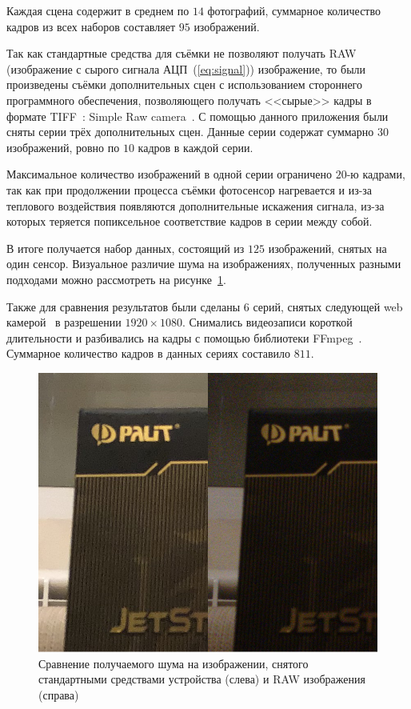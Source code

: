 Каждая сцена содержит в среднем по $14$ фотографий, суммарное количество кадров из всех наборов составляет $95$ изображений.


Так как стандартные средства для съёмки не позволяют получать RAW (изображение с сырого сигнала АЦП~(\ref{eq:signal})) изображение, то были произведены съёмки дополнительных сцен с использованием стороннего программного обеспечения, позволяющего получать <<сырые>>  кадры в формате TIFF~\autocite{TIFFArticle}: Simple Raw camera~\autocite{RAWCamera}. С помощью данного приложения были сняты серии трёх дополнительных сцен. Данные серии содержат суммарно $30$ изображений, ровно по $10$ кадров в каждой серии.

Максимальное количество изображений в одной серии ограничено $20$-ю кадрами, так как при продолжении процесса съёмки фотосенсор нагревается и из-за теплового воздействия появляются дополнительные искажения сигнала, из-за которых теряется попиксельное соответствие кадров в серии между собой.

В итоге получается набор данных, состоящий из $125$ изображений, снятых на один сенсор. Визуальное различие шума на изображениях, полученных разными подходами можно рассмотреть на рисунке~\ref{fig:noise_comprasion}.

Также для сравнения результатов были сделаны 6 серий, снятых следующей web камерой~\autocite{WebCam} в разрешении $1920\times1080$. Снимались видеозаписи короткой длительности и разбивались на кадры с помощью библиотеки FFmpeg~\autocite{FFMPEG}. Суммарное количество кадров в данных сериях составило $811$.

\begin{figure}[h]
	\centering
	\includegraphics[width=\textwidth]{img/noise_comprasion}
	\caption{Сравнение получаемого шума на изображении, снятого стандартными средствами устройства (слева) и RAW изображения (справа)}
	\label{fig:noise_comprasion}
\end{figure}


